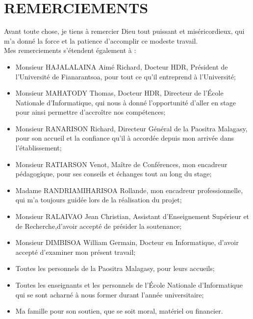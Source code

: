 \documentclass[12pt]{report}
\begin{document}
			\chapter*{REMERCIEMENTS}
			\begin{center}
				\begin{minipage}{\textwidth}
					\hspace{15pt} Avant toute chose, je tiens à remercier Dieu tout puissant et miséricordieux, qui m'a donné la force et la patience d'accomplir ce modeste travail.\\[0.5cm]
					Mes remerciements s’étendent également à :
					\begin{itemize}
						\item Monsieur HAJALALAINA Aimé Richard, Docteur HDR, Président de l'Université de Fianarantsoa, pour tout ce qu'il entreprend à l'Université;
						\item Monsieur MAHATODY Thomas, Docteur HDR, Directeur de l’École Nationale d'Informatique, qui nous à donné l'opportunité d'aller en stage pour ainsi permettre d’accroître nos compétences;
						\item Monsieur RANARISON Richard, Directeur Général de la Paositra Malagasy, pour son accueil et la confiance qu'il à accordée depuis mon arrivée dans l’établissement;
						\item Monsieur RATIARSON Venot, Maître de Conférences, mon encadreur pédagogique, pour ses conseils et échanges tout au long du stage;
						\item Madame RANDRIAMIHARISOA Rollande, mon encadreur professionnelle, qui m'a toujours guidée lors de la réalisation du projet;
						\item Monsieur RALAIVAO Jean Christian, Assistant d'Enseignement Supérieur et de Recherche,d’avoir accepté de présider la soutenance;
					 	\item Monsieur DIMBISOA William Germain, Docteur en Informatique, d'avoir accepté d'examiner mon présent travail;
						\item Toutes les personnels de la Paositra Malagasy, pour leurs accueils;
						\item Toutes les enseignants et les personnels de l’École Nationale d'Informatique qui se sont acharné à nous former durant l'année universitaire;
						\item Ma famille pour son soutien, que se soit moral, matériel ou financier.
					\end{itemize}
				\end{minipage}
			\end{center}
			\newpage
			\tableofcontents
			\newpage
\end{document}
